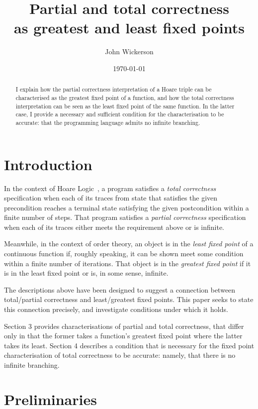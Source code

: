 \documentclass{llncs}
\title{Partial and total correctness \\ as greatest and least fixed points}
\author{John Wickerson}
\institute{Imperial College London}
\date{\today}
\begin{document}
\maketitle

\thispagestyle{plain}
\pagestyle{plain}

\begin{abstract}
I explain how the partial correctness interpretation of a Hoare triple can be characterised as the greatest fixed point of a function, and how the total correctness interpretation can be seen as the least fixed point of the same function. In the latter case, I provide a necessary and sufficient condition for the characterisation to be accurate: that the programming language admits no infinite branching.
\end{abstract}

\section{Introduction}

In the context of Hoare Logic~\cite{hoare69}, a program satisfies a \emph{total correctness} specification when each of its traces from state that satisfies the given precondition reaches a terminal state satisfying the given postcondition within a finite number of steps. That program satisfies a \emph{partial correctness} specification when each of its traces either meets the requirement above or is infinite.

Meanwhile, in the context of order theory, an object is in the \emph{least fixed point} of a continuous function if, roughly speaking, it can be shown meet some condition within a finite number of iterations. That object is in the \emph{greatest fixed point} if it is in the least fixed point or is, in some sense, infinite.

The descriptions above have been designed to suggest a connection between total/partial correctness and least/greatest fixed points. This paper seeks to state this connection precisely, and investigate conditions under which it holds. 

Section 3 provides characterisations of partial and total correctness, that differ only in that the former takes a function's greatest fixed point where the latter takes its least. Section 4 describes a condition that is necessary for the fixed point characterisation of total correctness to be accurate: namely, that there is no infinite branching.

\section{Preliminaries}
\end{document}
